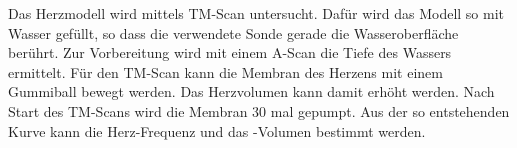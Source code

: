 Das Herzmodell wird mittels TM-Scan untersucht.
Dafür wird das Modell so mit Wasser gefüllt, so dass die verwendete Sonde gerade die Wasseroberfläche berührt.
Zur Vorbereitung wird mit einem A-Scan die Tiefe des Wassers ermittelt.
Für den TM-Scan kann die Membran des Herzens mit einem Gummiball bewegt werden.
Das Herzvolumen kann damit erhöht werden.
Nach Start des TM-Scans wird die Membran 30 mal gepumpt.
Aus der so entstehenden Kurve kann die Herz-Frequenz und das -Volumen bestimmt werden.

